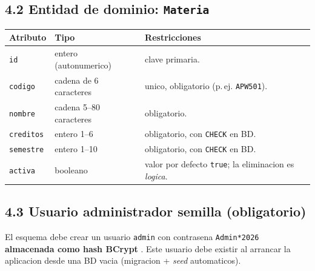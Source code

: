\documentclass[10pt,a4paper]{article}
\begin{document}
\subsection*{4.2 Entidad de dominio: \texttt{Materia}}
\noindent
\begin{tabular}{|C{2.2cm}|C{4.0cm}|C{7.0cm}|}
    \hline
    \textbf{Atributo} & \textbf{Tipo} & \textbf{Restricciones} \\
    \hline
    \texttt{id} & entero (autonumerico) & clave primaria. \\
    \hline
    \texttt{codigo} & cadena de 6 caracteres & unico, obligatorio (p.\,ej. \texttt{APW501}). \\
    \hline
    \texttt{nombre} & cadena 5--80 caracteres & obligatorio. \\
    \hline
    \texttt{creditos} & entero 1--6 & obligatorio, con \texttt{CHECK} en BD. \\
    \hline
    \texttt{semestre} & entero 1--10 & obligatorio, con \texttt{CHECK} en BD. \\
    \hline
    \texttt{activa} & booleano & valor por defecto \texttt{true}; la eliminacion es \emph{logica}. \\
    \hline
\end{tabular}

\subsection*{4.3 Usuario administrador semilla (obligatorio)}
El esquema debe crear un usuario \texttt{admin} con contrasena \texttt{Admin*2026} \textbf{almacenada como hash BCrypt} \cite{owasp2021top10,ortega2022securecoding}. Este usuario debe existir al arrancar la aplicacion desde una BD vacia (migracion + \emph{seed} automaticos).
\end{document}
